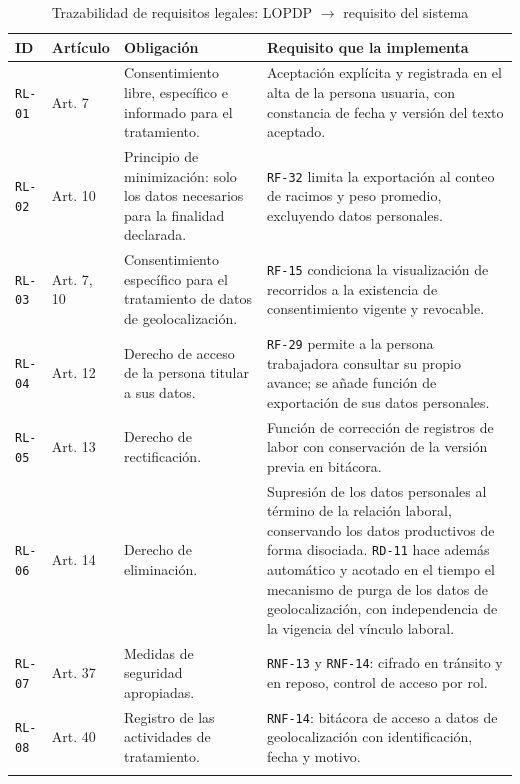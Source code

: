 \documentclass[11pt,a4paper]{article}
\newcommand{\id}[1]{\texttt{\begingroup\hyphenpenalty=10000\relax#1\endgroup}}
\renewcommand{\id}[1]{\texttt{#1}}
\begin{document}
\begin{longtable}{|C{1.5cm}|C{1.8cm}|L{6.0cm}|L{5.4cm}|}
\hline
{}\textbf{ID} & \textbf{Artículo} & \textbf{Obligación} & \textbf{Requisito que la implementa} \\
\hline
\endhead
\id{RL-01} & Art. 7 & Consentimiento libre, específico e informado para el tratamiento. & Aceptación explícita y registrada en el alta de la persona usuaria, con constancia de fecha y versión del texto aceptado. \\ \hline
\id{RL-02} & Art. 10 & Principio de minimización: solo los datos necesarios para la finalidad declarada. & \id{RF-32} limita la exportación al conteo de racimos y peso promedio, excluyendo datos personales. \\ \hline
\id{RL-03} & Art. 7, 10 & Consentimiento específico para el tratamiento de datos de geolocalización. & \id{RF-15} condiciona la visualización de recorridos a la existencia de consentimiento vigente y revocable. \\ \hline
\id{RL-04} & Art. 12 & Derecho de acceso de la persona titular a sus datos. & \id{RF-29} permite a la persona trabajadora consultar su propio avance; se añade función de exportación de sus datos personales. \\ \hline
\id{RL-05} & Art. 13 & Derecho de rectificación. & Función de corrección de registros de labor con conservación de la versión previa en bitácora. \\ \hline
\id{RL-06} & Art. 14 & Derecho de eliminación. & Supresión de los datos personales al término de la relación laboral, conservando los datos productivos de forma disociada. \id{RD-11} hace además automático y acotado en el tiempo el mecanismo de purga de los datos de geolocalización, con independencia de la vigencia del vínculo laboral. \\ \hline
\id{RL-07} & Art. 37 & Medidas de seguridad apropiadas. & \id{RNF-13} y \id{RNF-14}: cifrado en tránsito y en reposo, control de acceso por rol. \\ \hline
\id{RL-08} & Art. 40 & Registro de las actividades de tratamiento. & \id{RNF-14}: bitácora de acceso a datos de geolocalización con identificación, fecha y motivo. \\ \hline
\caption{Trazabilidad de requisitos legales: LOPDP $\rightarrow$ requisito del sistema}
\end{longtable}
\end{document}
